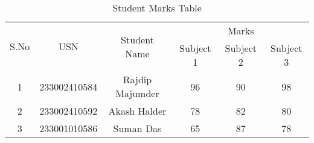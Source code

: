 \documentclass{article}
\begin{document}
\begin{table}[h!]
\centering
\begin{tabular}{|c|c|c|c|c|c|}
\hline
\multirow{2}{*}{S.No} & \multirow{2}{*}{USN} & \multirow{2}{*}{Student Name} & \multicolumn{3}{c|}{Marks} \\ \cline{4-6} 
                      &                      &                               & Subject 1 & Subject 2 & Subject 3 \\ \hline
1                     & 233002410584                & Rajdip Majumder         & 96        & 90        & 98        \\ \hline
2                     & 233002410592                & Akash Halder                   & 78        & 82        & 80        \\ \hline
3                     & 233001010586                & Suman Das               & 65        & 87        & 78        \\ \hline
\end{tabular}
\caption{Student Marks Table}
\label{tab:student_marks}
\end{table}
\end{document}
